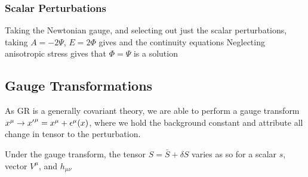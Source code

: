 \documentclass{article}
\begin{document}
\subsubsection{Scalar Perturbations}
Taking the Newtonian gauge, and  selecting out just the scalar perturbations, taking $A=-2\Psi$, $E=2\Phi$ gives 
and the continuity equations 
Neglecting anisotropic stress gives that $\Phi=\Psi$ is a solution

\subsection{Gauge Transformations}

As GR is a generally covariant theory, we are able to perform a gauge transform $x^\mu \to {x^\prime}^\mu = x^\mu + \epsilon^\mu(x)$, where we hold the background constant and attribute all change in tensor to the perturbation. 

\begin{prop}
Under the gauge transform, the tensor $S = \bar{S} + \delta S$ varies as 
so for a scalar $s$, vector $V^\mu$, and $h_{\mu\nu}$
\end{prop}
\end{document}

